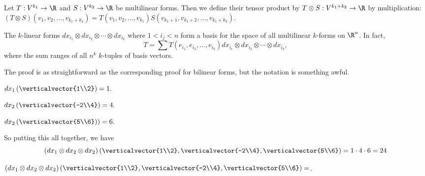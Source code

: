 \documentclass{ximera}
\begin{document}
\begin{definition}
  Let $T:V^{k_1} \to \R$ and $S:V^{k_2} \to \R$ be multilinear forms.  Then we define their tensor product by $T \otimes S: V^{k_1 + k_2} \to \R$ by multiplication:
  $(T \otimes S)(v_1,v_2, \ldots ,v_{k_1+k_2}) = T(v_1,v_2, \ldots ,v_{k_1})S(v_{k_1+1},v_{k_1+2}, \ldots ,v_{k_1+k_2})$.
\end{definition}

\begin{theorem}
  The $k$-linear forms $dx_{i_1} \otimes dx_{i_2} \otimes \cdots \otimes dx_{i_k}$ where $1<i_j<n $ form a basis for the space of all multilinear $k$-forms on $\R^n$.  In fact,
  \[
  T = \sum T(e_{i_1},e_{i_2}, \ldots ,e_{i_k}) dx_{i_1} \otimes dx_{i_2} \otimes \cdots \otimes dx_{i_k},
  \]
  where the sum ranges of all $n^k$  $k$-tuples of basis vectors.
\end{theorem}

The proof is as straightforward as the corresponding proof for bilinear forms, but the notation is something awful.

\begin{question}
  \begin{solution}
    \begin{hint}
      \(dx_1 \left(\verticalvector{1\\2}\right) = 1.\)
    \end{hint}
    \begin{hint}
      \(dx_2 \left(\verticalvector{-2\\4}\right) = 4.\)
    \end{hint}
    \begin{hint}
      \(dx_2 \left(\verticalvector{5\\6}\right)) = 6.\)
    \end{hint}
    \begin{hint}
      So putting this all together, we have
      \[
      \left(dx_1 \otimes dx_2 \otimes dx_2\right) \left(\verticalvector{1\\2},\verticalvector{-2\\4},\verticalvector{5\\6}\right) = 1 \cdot 4 \cdot 6 = 24
      \]
    \end{hint}
    $\left( dx_1 \otimes dx_2 \otimes dx_2 \right) \left(\verticalvector{1\\2},\verticalvector{-2\\4},\verticalvector{5\\6}\right) = $.
  \end{solution}
\end{question}
\end{document}
